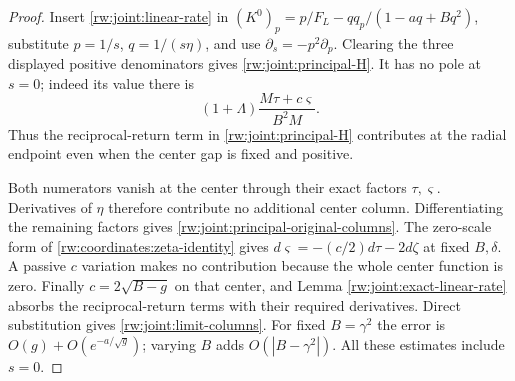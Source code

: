 \begin{proof}
Insert \eqref{rw:joint:linear-rate} in
$(K^0)_p=p/F_L-q q_p/(1-aq+Bq^2)$, substitute
$p=1/s$, $q=1/(s\eta)$, and use
$\partial_s=-p^2\partial_p$. Clearing the three displayed
positive denominators gives \eqref{rw:joint:principal-H}.
It has no pole at $s=0$; indeed its value there is
\[
 (1+\Lambda)\frac{M\tau+c\varsigma}{B^2M}.
\]
Thus the reciprocal-return term in
\eqref{rw:joint:principal-H} contributes at the radial endpoint even
when the center gap is fixed and positive.

Both numerators vanish at the center through their exact factors
$\tau,\varsigma$. Derivatives of $\eta$ therefore contribute no
additional center column. Differentiating the remaining factors gives
\eqref{rw:joint:principal-original-columns}.
The zero-scale form of
\eqref{rw:coordinates:zeta-identity} gives
$d\varsigma=-(c/2)d\tau-2d\zeta$ at fixed $B,\delta$.
A passive $c$ variation makes no contribution because the whole
center function is zero. Finally
$c=2\sqrt{B-g}$ on that center, and Lemma
\ref{rw:joint:exact-linear-rate} absorbs the reciprocal-return
terms with their required derivatives. Direct substitution gives
\eqref{rw:joint:limit-columns}. For fixed $B=\gamma^2$ the error
is $O(g)+O(e^{-a/\sqrt g})$; varying $B$ adds
$O(|B-\gamma^2|)$. All these estimates include $s=0$.
\end{proof}
